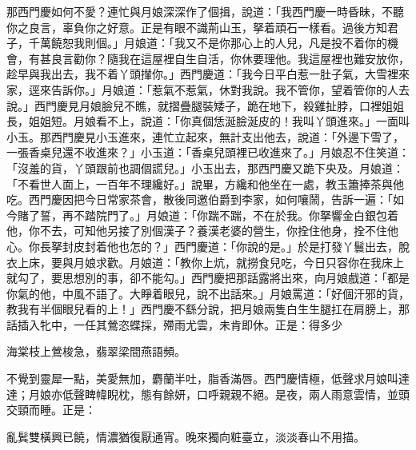 那西門慶如何不愛？{}連忙與月娘深深作了個揖，說道：「我西門慶一時昏昧，不聽你之良言，辜負你之好意。正是有眼不識荊山玉，拏着頑石一樣看。過後方知君子，千萬饒恕我則個。」月娘道：「我又不是你那心上的人兒，凡是投不着你的機會，有甚良言勸你？隨我在這屋裡自生自活，你休要理他。我這屋裡也難安放你，趁早與我出去，我不着丫頭攆你。」西門慶道：「我今日平白惹一肚子氣，大雪裡來家，逕來告訴你。」月娘道：「惹氣不惹氣，休對我說。我不管你，望着管你的人去說。」西門慶見月娘臉兒不瞧，就摺疊腿裝矮子，跪在地下，殺雞扯脖，口裡姐姐長，姐姐短。月娘看不上，說道：「你真個恁涎臉涎皮的！我叫丫頭進來。」一面叫小玉。那西門慶見小玉進來，連忙立起來，無計支出他去，說道：「外邊下雪了，一張香桌兒還不收進來？」小玉道：「香桌兒頭裡已收進來了。」月娘忍不住笑道：「沒羞的貨，丫頭跟前也調個謊兒。」{}小玉出去，那西門慶又跪下央及。月娘道：「不看世人面上，一百年不理纔好。」說畢，方纔和他坐在一處，教玉簫捧茶與他吃。西門慶因把今日常家茶會，散後同邀伯爵到李家，如何嚷鬧，告訴一遍：「如今賭了誓，再不踏院門了。」月娘道：「你踹不踹，不在於我。你拏響金白銀包着他，你不去，可知他另接了別個漢子？養漢老婆的營生，你拴住他身，拴不住他心。你長拏封皮封着他也怎的？」西門慶道：「你說的是。」於是打發丫鬟出去，脫衣上床，要與月娘求歡。月娘道：「教你上炕，就撈食兒吃，今日只容你在我床上就勾了，要思想別的事，卻不能勾。」西門慶把那話露將出來，向月娘戲道：「都是你氣的他，中風不語了。大睜着眼兒，說不出話來。」月娘罵道：「好個汗邪的貨，教我有半個眼兒看的上！」西門慶不繇分說，把月娘兩隻白生生腿扛在肩膀上，那話插入牝中，一任其鶯恣蝶採，殢雨尤雲，未肯即休。正是：得多少

海棠枝上鶯梭急，翡翠梁間燕語頻。

不覺到靈犀一點，美愛無加，麝蘭半吐，脂香滿唇。西門慶情極，低聲求月娘叫達達；月娘亦低聲睥幃睨枕，態有餘妍，{}口呼親親不絕。是夜，兩人雨意雲情，並頭交頸而睡。正是：

亂鬂雙橫興已饒，情濃猶復厭通宵。晚來獨向粧臺立，淡淡春山不用描。

